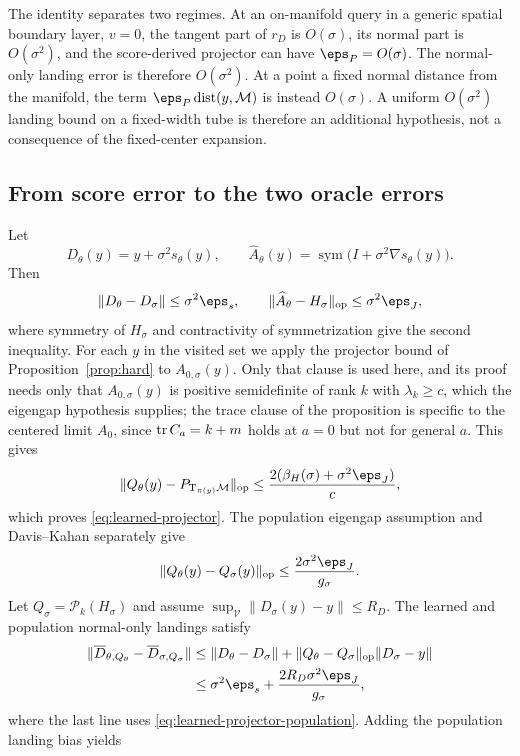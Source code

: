 The identity separates two regimes.  At an on-manifold query in a generic spatial boundary layer, $v=0$, the tangent part of $r_D$ is $O(\sigma)$, its normal part is $O(\sigma^2)$, and the score-derived projector can have $\eps_P=O(\sigma)$.  The normal-only landing error is therefore $O(\sigma^2)$.  At a point a fixed normal distance from the manifold, the term $\eps_P\dist(y,\M)$ is instead $O(\sigma)$.  A uniform $O(\sigma^2)$ landing bound on a fixed-width tube is therefore an additional hypothesis, not a consequence of the fixed-center expansion.

\subsection{From score error to the two oracle errors}

Let
\[
  D_\theta(y)=y+\sigma^2s_\theta(y),\qquad
  \widehat A_\theta(y)=\operatorname{sym}
  \bigl(I+\sigma^2\nabla s_\theta(y)\bigr).
\]
Then
\[
  \|D_\theta-D_\sigma\|\le\sigma^2\eps_s,\qquad
  \|\widehat A_\theta-H_\sigma\|_\op\le\sigma^2\eps_J,
\]
where symmetry of $H_\sigma$ and contractivity of symmetrization give the second inequality.  For each $y$ in the visited set we apply the projector bound of Proposition~\ref{prop:hard} to $A_{0,\sigma}(y)$.  Only that clause is used here, and its proof needs only that $A_{0,\sigma}(y)$ is positive semidefinite of rank $k$ with $\lambda_k\ge c$, which the eigengap hypothesis supplies; the trace clause of the proposition is specific to the centered limit $A_0$, since $\operatorname{tr} C_a=k+m$ holds at $a=0$ but not for general $a$.  This gives
\[
  \|Q_\theta(y)-P_{\T_{\pi(y)}\M}\|_\op
  \le\frac{2(\beta_H(\sigma)+\sigma^2\eps_J)}{c},
\]
which proves \eqref{eq:learned-projector}.  The population eigengap assumption and Davis--Kahan separately give
\begin{equation}
  \|Q_\theta(y)-Q_\sigma(y)\|_\op
  \le\frac{2\sigma^2\eps_J}{g_\sigma}.
  \label{eq:learned-projector-population}
\end{equation}
Let $Q_\sigma=\mathcal P_k(H_\sigma)$ and assume
$\sup_{\mathcal V}\|D_\sigma(y)-y\|\le R_D$.  The learned and population normal-only landings satisfy
\begin{align}
  \|\overline D_{\theta,Q_\theta}
  -\overline D_{\sigma,Q_\sigma}\|
  &\le
  \|D_\theta-D_\sigma\|
  +\|Q_\theta-Q_\sigma\|_\op\|D_\sigma-y\|\\
  &\le \sigma^2\eps_s
  +\frac{2R_D\sigma^2\eps_J}{g_\sigma},
\end{align}
where the last line uses \eqref{eq:learned-projector-population}.  Adding the population landing bias yields
